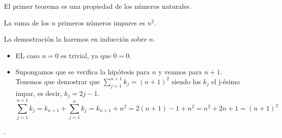 %
\begin{isabellebody}%
%
%
\isadelimtheory
%
\endisadelimtheory
%
\isatagtheory
%
\endisatagtheory
{\isafoldtheory}%
%
\isadelimtheory
%
\endisadelimtheory
%
\isadelimdocument
%
\endisadelimdocument
%
\isatagdocument
%
\isamarkuptrue%
%
\endisatagdocument
{\isafolddocument}%
%
\isadelimdocument
%
\endisadelimdocument
%
\begin{isamarkuptext}%
El primer teorema es una propiedad de los números naturales.

  \begin{teorema}
    La suma de los $n$ primeros números impares es $n^2$.
  \end{teorema}

  \begin{demostracion}
    La demostración la haremos en inducción sobre $n$.
\begin {itemize}
\item EL caso $n = 0$ es trivial, ya que $0 = 0$.
\item Supongamos que se verifica la hipótesis para $n$ y veamos para
 $n+1$. \\
Tenemos que demostrar que $\sum_{j=1}^{n+1} k_j = (n+1)^2$ siendo los
 $k_{j}$ el j-ésimo impar, es decir, $k_{j} = 2j - 1$.
$$\sum_{j = 1}^{n+1} k_{j} = k_{n+1} + \sum^{n}_{j=1} k_{j} = k_{n+1} +
 n^{2} = 2(n+1) - 1 + n^2 = n^2 + 2n + 1 = (n+1)^2$$ 
\end {itemize}
.
  \end{demostracion}


\end{isamarkuptext}
\end{isabellebody}
